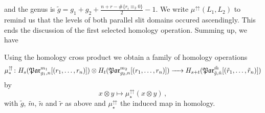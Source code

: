 and the genus is $\tilde g = g_1 + g_2 + \frac{n+r-\#\{r_i \equiv_2 0\}}{2} - 1$.
We write $\mu^\upuparrows(L_1, L_2)$ to remind us that the levels of both parallel slit domains occured ascendingly.
This ends the discussion of the first selected homology operation.
Summing up, we have
\begin{defprop}
    \label{homology_operations:parallel_patching_slit_pics:operation_mu_upuparrows}
    Using the homology cross product we obtain a family of homology operations
    \[
        \mu^\upuparrows_\ast \colon H_s(\Par_{g_1,n}^{m_1}[(r_1, \ldots, r_n)])  \otimes H_t(\Par_{g_2,n}^{m_2}[(r_1, \ldots, r_n)]) \to H_{s+t}(\Par_{\tilde g,\tilde n}^{\tilde m}[(\tilde r_1, \ldots, \tilde r_n)])
    \]
    by
    \[
        x \otimes y \mapsto \mu^\upuparrows_\star( x \otimes y ) \,,
    \]
    with $\tilde g$, $\tilde m$, $\tilde n$ and $\tilde r$ as above and $\mu^\upuparrows_\star$ the induced map in homology.
\end{defprop}

